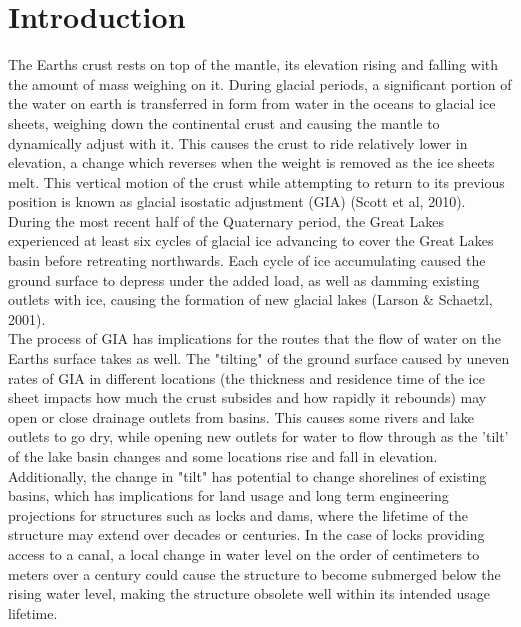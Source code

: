 \documentclass{article}
\begin{document}


\tableofcontents
\newpage


\setcounter{secnumdepth}{0}

\setcounter{secnumdepth}{1}

\newpage


\section{Introduction}

 The Earths crust rests on top of the mantle, its elevation rising and falling
 with the amount of mass weighing on it. During glacial periods, a significant portion
 of the water on earth is transferred in form from water in the oceans to glacial ice sheets,
 weighing down the continental crust and causing the mantle to dynamically adjust
 with it. This causes the crust to ride relatively lower in elevation,
 a change which reverses when the weight is removed as the ice sheets melt.
 This vertical motion of the crust while attempting to return to its previous position is known
 as glacial isostatic adjustment (GIA) (Scott et al, 2010). During the most recent
 half of the Quaternary period, the Great Lakes experienced at least six cycles 
 of glacial ice advancing to cover the Great Lakes basin before retreating northwards. Each
 cycle of ice accumulating caused the ground surface to depress under the added 
 load, as well as damming existing outlets with ice, causing the formation
 of new glacial lakes (Larson \& Schaetzl, 2001).\\
 
 The process of GIA has implications for the routes that the flow
 of water on the Earths surface takes as well. The "tilting" of the ground surface caused by 
 uneven rates of GIA in different locations (the thickness and residence time of
 the ice sheet impacts how much the crust subsides and how rapidly it rebounds) 
 may open or close drainage outlets from basins. This
 causes some rivers and lake outlets to go dry, while opening new outlets for 
 water to flow through as the 'tilt' of the lake basin changes and some locations
 rise and fall in elevation.
 Additionally, the change in "tilt" has potential to change shorelines of existing
 basins,  which has implications for land usage and long term engineering
 projections for structures such as locks and dams, where the lifetime of
 the structure may extend over decades or centuries. In the case of locks providing
 access to a canal, a local change in water level on the order of centimeters to
 meters over a century could cause the structure to become submerged below the
 rising water level, making the structure obsolete well within its intended usage
 lifetime.\\
\end{document}
